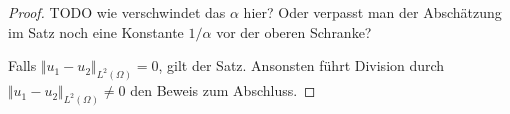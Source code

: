 \begin{proof}
  TODO wie verschwindet das $\alpha$ hier? Oder verpasst man der Abschätzung 
  im Satz noch eine Konstante $1/\alpha$ vor der oberen Schranke?

  Falls $\Vert u_1 - u_2 \Vert_{L^2(\Omega)} = 0$, gilt der Satz.
  Ansonsten führt Division durch \\
  $\Vert u_1 - u_2 \Vert_{L^2(\Omega)}\neq 0$ den 
  Beweis zum Abschluss.
\end{proof}
